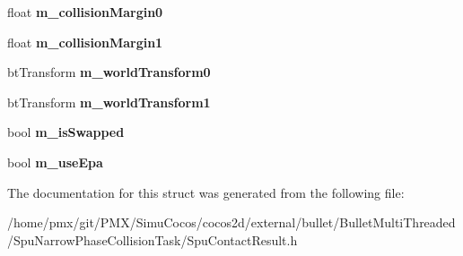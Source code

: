 \begin{DoxyCompactItemize}
float {\bfseries m\+\_\+collision\+Margin0}
\item 
\mbox{\label{structSpuCollisionPairInput_a3a515e9c9777d2f53b300a8ce5aaffa0}} 
float {\bfseries m\+\_\+collision\+Margin1}
\item 
\mbox{\label{structSpuCollisionPairInput_a5382f102fc5c2d7d8025ab9bb3dc0f11}} 
bt\+Transform {\bfseries m\+\_\+world\+Transform0}
\item 
\mbox{\label{structSpuCollisionPairInput_a74c910d0cc7e0982c78e49c52d1150a3}} 
bt\+Transform {\bfseries m\+\_\+world\+Transform1}
\item 
\mbox{\label{structSpuCollisionPairInput_a0b5d64f3872d07a236dbb91072518499}} 
bool {\bfseries m\+\_\+is\+Swapped}
\item 
\mbox{\label{structSpuCollisionPairInput_a7f1ea11d962827fccbd7862e9fe4915e}} 
bool {\bfseries m\+\_\+use\+Epa}
\end{DoxyCompactItemize}


The documentation for this struct was generated from the following file\+:\begin{DoxyCompactItemize}
\item 
/home/pmx/git/\+P\+M\+X/\+Simu\+Cocos/cocos2d/external/bullet/\+Bullet\+Multi\+Threaded/\+Spu\+Narrow\+Phase\+Collision\+Task/Spu\+Contact\+Result.\+h\end{DoxyCompactItemize}
